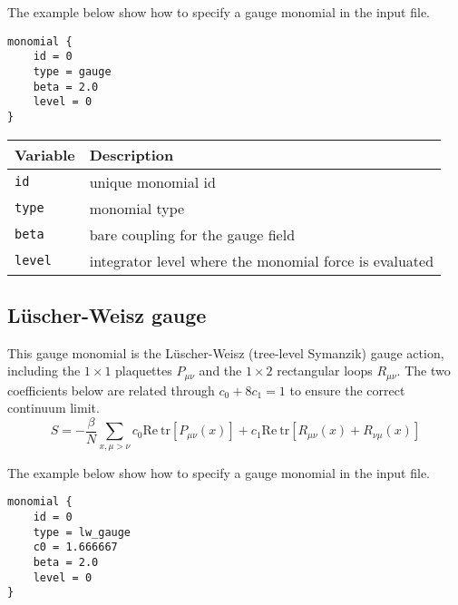 \documentclass[12pt]{article}
\begin{document}
The example below show how to specify a gauge monomial in the input file.
\begin{center}
\begin{minipage}{42mm}
\begin{framed}
\begin{verbatim}
monomial {
    id = 0
    type = gauge
    beta = 2.0
    level = 0
}
\end{verbatim}
\vspace{-5mm}
\end{framed}
\end{minipage}
\end{center}

\vspace{2mm}

\begin{center}
\begin{tabular}{l|l}
 Variable & Description \\
 \hline
 \verb|id|    & unique monomial id \\
 \verb|type|  & monomial type \\
 \verb|beta|  & bare coupling for the gauge field \\
 \verb|level| & integrator level where the monomial force is evaluated
\end{tabular}
\end{center}

\newpage
\newpage
\subsection*{L\"uscher-Weisz gauge}
This gauge monomial is the L\"uscher-Weisz (tree-level Symanzik) gauge action, including the $1\times1$ plaquettes $P_{\mu\nu}$ and the $1\times2$ rectangular loops $R_{\mu\nu}$. The two coefficients below are related through $c_0+8c_1=1$ to ensure the correct continuum limit.
\begin{equation}
 S = -\frac{\beta}{N}\sum_{x,\mu>\nu} c_0\textrm{Re}~\textrm{tr}[P_{\mu\nu}(x)] + c_1\textrm{Re}~\textrm{tr}[R_{\mu\nu}(x)+R_{\nu\mu}(x)]
\end{equation}

The example below show how to specify a gauge monomial in the input file.
\begin{center}
\begin{minipage}{48mm}
\begin{framed}
\begin{verbatim}
monomial {
    id = 0
    type = lw_gauge
    c0 = 1.666667
    beta = 2.0
    level = 0
}
\end{verbatim}
\vspace{-5mm}
\end{framed}
\end{minipage}
\end{center}
\end{document}
